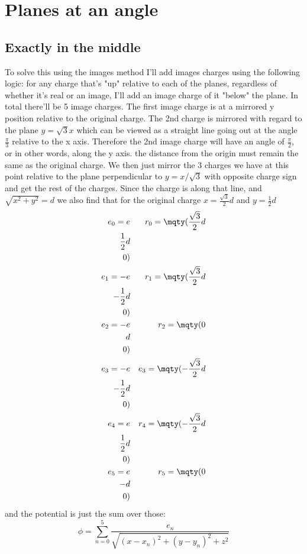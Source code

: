 \clearpage
\section{Planes at an angle}
\subsection{Exactly in the middle}
To solve this using the images method I'll add images charges using the following logic: for any charge that's "up" relative to each of the planes, regardless of whether it's real or an image, I'll add an image charge of it "below" the plane. In total there'll be 5 image charges. The first image charge is at a mirrored y position relative to the original charge. The 2nd charge is mirrored with regard to the plane $y=\sqrt{3}x$ which can be viewed as a straight line going out at the angle $\frac{\pi}{3}$ relative to the x axis. Therefore the 2nd image charge will have an angle of $\frac{\pi}{2}$, or in other words, along the y axis. the distance from the origin must remain the same as the original charge. We then just mirror the 3 charges we have at this point relative to the plane perpendicular to $y=x/\sqrt{3}$ with opposite charge sign and get the rest of the charges. Since the charge is along that line, and $\sqrt{x^2+y^2}=d$ we also find that for the original charge $x=\frac{\sqrt{3}}{2}d$ and $y=\frac{1}{2}d$
\begin{align}
	e_0=e && r_0=\mqty(\frac{\sqrt{3}}{2}d\\\frac{1}{2}d\\0)\\
	e_1=-e && r_1=\mqty(\frac{\sqrt{3}}{2}d\\-\frac{1}{2}d\\0)\\
	e_2=-e && r_2=\mqty(0\\d\\0)\\
	e_3=-e && e_3=\mqty(-\frac{\sqrt{3}}{2}d\\-\frac{1}{2}d\\0)\\
	e_4=e && r_4=\mqty(-\frac{\sqrt{3}}{2}d\\\frac{1}{2}d\\0)\\
	e_5=e && r_5=\mqty(0\\-d\\0)
\end{align}
and the potential is just the sum over those:
\begin{equation}
  \phi = \sum\limits_{n=0}^5\frac{e_n}{\sqrt{(x-x_n)^2+(y-y_n)^2+z^2}}
\end{equation}
